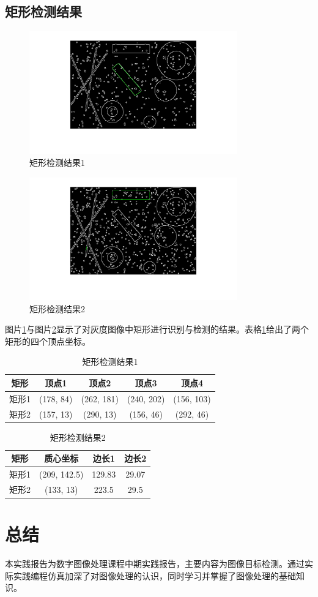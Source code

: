 \documentclass[conference]{IEEEtran}
\begin{document}
\subsection{矩形检测结果}
\begin{figure}[htbp]
	\centerline{
		\includegraphics[width=9cm]{triangle1.png} 	
	}
	\caption{矩形检测结果1}
	\label{pic8}
\end{figure}
\begin{figure}[htbp]
	\centerline{
		\includegraphics[width=9cm]{tri2.png} 	
	}
	\caption{矩形检测结果2}
	\label{pic9}
\end{figure}
图片\ref{pic8}与图片\ref{pic9}显示了对灰度图像中矩形进行识别与检测的结果。表格\ref{table3}给出了两个矩形的四个顶点坐标。

\begin{table}[htbp]
	\caption{矩形检测结果1}
	\label{table3} 
	\centering  
	\begin{tabular}{|c|c|c|c|c|}
	\hline
	矩形 & 顶点1 & 顶点2 & 顶点3 & 顶点4 \\
	\hline
	矩形1 & (178, 84)  & (262, 181) & (240, 202) & (156, 103) \\
	\hline
	矩形2 & (157, 13) & (290, 13) & (156, 46) & (292, 46) \\
	\hline
	\end{tabular}
\end{table}

\begin{table}[htbp]
	\caption{矩形检测结果2}
	\label{table4} 
	\centering  
	\begin{tabular}{|c|c|c|c|}
	\hline
	矩形 & 质心坐标 & 边长1 & 边长2 \\
	\hline
	矩形1 & (209, 142.5)  & 129.83 & 29.07 \\
	\hline
	矩形2 & (133, 13) & 223.5 & 29.5 \\
	\hline
	\end{tabular}
\end{table}

\section{总结}
本实践报告为数字图像处理课程中期实践报告，主要内容为图像目标检测。通过实际实践编程仿真加深了对图像处理的认识，同时学习并掌握了图像处理的基础知识。
\end{document}
